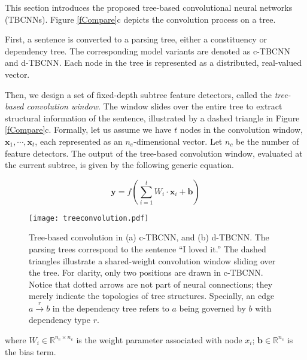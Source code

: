 \documentclass[11pt,a4paper]{article}
\begin{document}
This section introduces the proposed
tree-based convolutional neural networks (TBCNNs).
Figure \ref{fCompare}c depicts the convolution process on a tree.

First, a sentence is converted to a parsing tree,
either a constituency or dependency tree.
The corresponding model variants are denoted as c-TBCNN and d-TBCNN.
Each node in the tree is represented as a distributed, real-valued vector.

Then, we design a set of fixed-depth subtree feature detectors, called the
\textit{tree-based convolution window}.
The window
slides over the entire tree to extract structural information
of the sentence, illustrated by a dashed triangle in Figure \ref{fCompare}c.
Formally, let us assume we 
have $t$ nodes in the convolution window, $\bm x_1,\cdots, \bm x_t$, 
each represented as an $n_e$-dimensional vector.
Let $n_c$ be the number of feature detectors.
The output of the tree-based convolution window, evaluated at the current subtree, is
given by the following generic equation.

\vspace{-.3cm}
\begin{equation}\label{eConv}
\bm y=f\left(\sum_{i=1}^tW_i\!\cdot\!\bm x_i+\bm b\right)
\end{equation}
\vspace{-.3cm}

\begin{figure*}[!t]
\vspace{-.2cm}

\centering
\texttt{[image: treeconvolution.pdf]}

\vspace{-.5cm}
\caption{Tree-based convolution in (a) c-TBCNN, and
(b) d-TBCNN.
The parsing trees correspond to the sentence ``I loved it.''
The dashed triangles illustrate a shared-weight convolution
window sliding over the tree. For clarity, only two positions are drawn in c-TBCNN.
Notice that
dotted arrows are not part of neural connections; they merely indicate
the topologies of tree structures. Specially, an edge 
$a\overset{r}{\rightarrow} b$
in the dependency tree refers to $a$ being governed by $b$ with dependency type $r$.}
\vspace{-.35cm}
\label{fTBCNN}
\end{figure*}

\noindent where $W_i\in\mathbb{R}^{n_e\times n_c}$ is the weight parameter associated with
node $x_i$; $\bm b\in\mathbb{R}^{n_c}$ is the bias term.
\end{document}
